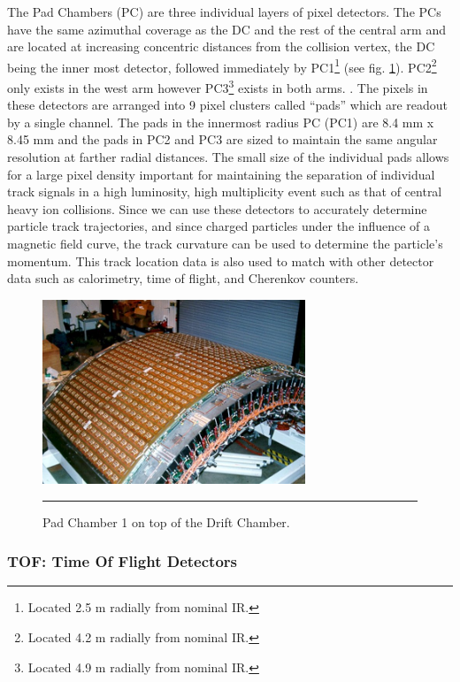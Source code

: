 The Pad Chambers\citep{PCfocus} (PC) are three individual layers of pixel detectors. The PCs have the same azimuthal coverage as the DC and the rest of the central arm and are located at increasing concentric distances from the collision vertex, the DC being the inner most detector, followed immediately by PC1\footnote{Located 2.5 m radially from nominal IR.} (see fig. \ref{fig:pcdiagram}). PC2\footnote{Located 4.2 m radially from nominal IR.} only exists in the west arm however PC3\footnote{Located 4.9 m radially from nominal IR.} exists in both arms. . The pixels in these detectors are arranged into 9 pixel clusters called ``pads'' which are readout by a single channel. The pads in the innermost radius PC (PC1) are 8.4 mm x 8.45 mm and the pads in PC2 and PC3 are sized to maintain the same angular resolution at farther radial distances. The small size of the individual pads allows for a large pixel density important for maintaining the separation of individual track signals in a high luminosity, high multiplicity event such as that of central heavy ion collisions. Since we can use these detectors to accurately determine particle track trajectories, and since charged particles under the influence of a magnetic field curve, the track curvature can be used to determine the particle's momentum. This track location data is also used to match with other detector data such as calorimetry, time of flight, and Cherenkov counters.
\begin{figure}[htbp]
  \centering
    \includegraphics[width=0.7\textwidth]{Figures/PC1.jpg}
    \rule{35em}{0.5pt}
  \caption[Pad Chamber 1 on top of the Drift Chamber.]{Pad Chamber 1 on top of the Drift Chamber.}
  \label{fig:pcdiagram}
\end{figure}

\subsubsection{TOF: Time Of Flight Detectors}

